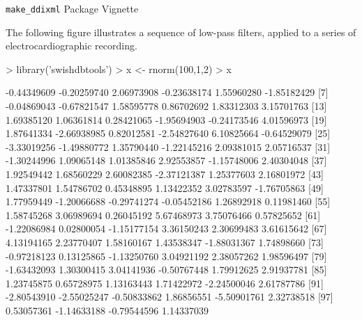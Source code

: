 \documentclass{article}
\begin{document}

\begin{center}
\Large
{\tt make\_ddixml} Package Vignette
\normalsize
\end{center}
The following figure illustrates a sequence of low-pass filters, applied to a series of electrocardiographic recording.
\begin{Schunk}
\begin{Sinput}
> library('swishdbtools')
> x <- rnorm(100,1,2)
> x
\end{Sinput}
\begin{Soutput}
  [1] -0.44349609 -0.20259740  2.06973908 -0.23638174  1.55960280 -1.85182429
  [7] -0.04869043 -0.67821547  1.58595778  0.86702692  1.83312303  3.15701763
 [13]  1.69385120  1.06361814  0.28421065 -1.95694903 -0.24173546  4.01596973
 [19]  1.87641334 -2.66938985  0.82012581 -2.54827640  6.10825664 -0.64529079
 [25] -3.33019256 -1.49880772  1.35790440 -1.22145216  2.09381015  2.05716537
 [31] -1.30244996  1.09065148  1.01385846  2.92553857 -1.15748006  2.40304048
 [37]  1.92549442  1.68560229  2.60082385 -2.37121387  1.25377603  2.16801972
 [43]  1.47337801  1.54786702  0.45348895  1.13422352  3.02783597 -1.76705863
 [49]  1.77959449 -1.20066688 -0.29741274 -0.05452186  1.26892918  0.11981460
 [55]  1.58745268  3.06989694  0.26045192  5.67468973  3.75076466  0.57825652
 [61] -1.22086984  0.02800054 -1.15177154  3.36150243  2.30699483  3.61615642
 [67]  4.13194165  2.23770407  1.58160167  1.43538347 -1.88031367  1.74898660
 [73] -0.97218123  0.13125865 -1.13250760  3.04921192  2.38057262  1.98596497
 [79] -1.63432093  1.30300415  3.04141936 -0.50767448  1.79912625  2.91937781
 [85]  1.23745875  0.65728975  1.13163443  1.71422972 -2.24500046  2.61787786
 [91] -2.80543910 -2.55025247 -0.50833862  1.86856551 -5.50901761  2.32738518
 [97]  0.53057361 -1.14633188 -0.79544596  1.14337039
\end{Soutput}
\end{Schunk}
\end{document}
